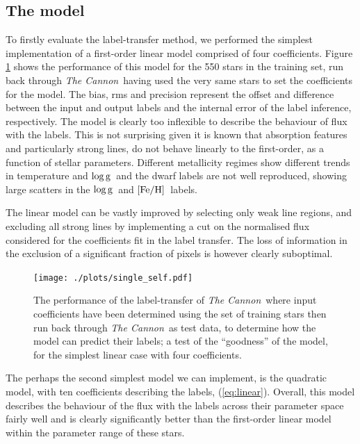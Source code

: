 \documentclass[12pt, preprint]{aastex}
\newcommand{\feh}{\mbox{$\rm [Fe/H]$}}
\newcommand{\logg}{\mbox{$\rm \log g$}}
\newcommand{\tc}{\textsl{The Cannon}}
\begin{document}
\subsection{The model} 

To firstly evaluate the label-transfer method, we performed the simplest implementation of a first-order linear model comprised of four coefficients. Figure \ref{fig:self1} shows the performance of this model for the 550 stars in the training set, run back through \tc\, having used the very same stars to set the coefficients for the model. The bias, rms and precision represent the offset and difference between the input and output labels and the internal error of the label inference, respectively. The model is clearly too inflexible to describe the behaviour of flux with the labels. This is not surprising given it is known that absorption features and particularly strong lines, do not behave linearly to the first-order, as a function of stellar parameters. Different metallicity regimes show different trends in  temperature and \logg\ and the dwarf labels are not well reproduced, showing large scatters in the \logg\ and \feh\ labels. 

The linear model can be vastly improved by selecting only weak line regions, and excluding all strong lines by implementing a cut on the normalised flux considered for the coefficients fit in the label transfer. The loss of information in the exclusion of a significant fraction of pixels is however clearly suboptimal. 

\begin{figure}[h!]
\centering
  \texttt{[image: ./plots/single\_self.pdf]}
\caption{The performance of the label-transfer of \tc\, where input coefficients have been determined using the set of training stars then run back through \tc\ as test data, to determine how the model can predict their labels; a test of the ``goodness'' of the model, for the simplest linear case with four coefficients. }
\label{fig:self1}
\end{figure}


The perhaps the second simplest model we can implement, is the quadratic model, with ten coefficients describing the labels, (\ref{eq:linear}).  Overall, this model describes the behaviour of the flux with the labels across their parameter space fairly well and is clearly significantly better than the first-order linear model within the parameter range of these stars. 
\end{document}
